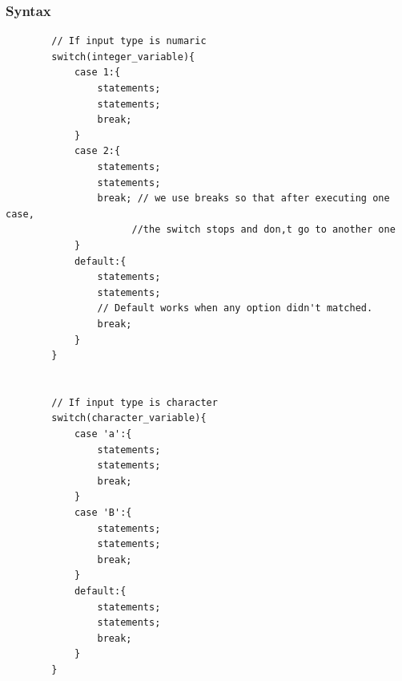 \documentclass[A4 paper,openany]{book}  %
\begin{document}
\subsubsection{Syntax}
\begin{center}
    \begin{verbatim}
        // If input type is numaric
        switch(integer_variable){
            case 1:{
                statements;
                statements;
                break;
            }
            case 2:{
                statements;
                statements;
                break; // we use breaks so that after executing one case, 
                      //the switch stops and don,t go to another one
            }
            default:{
                statements;
                statements;
                // Default works when any option didn't matched.
                break;
            }
        }


        // If input type is character
        switch(character_variable){
            case 'a':{
                statements;
                statements;
                break;
            }
            case 'B':{
                statements;
                statements;
                break;
            }
            default:{
                statements;
                statements;
                break;
            }
        }
    \end{verbatim}
\end{center}
% 
%
\end{document}
